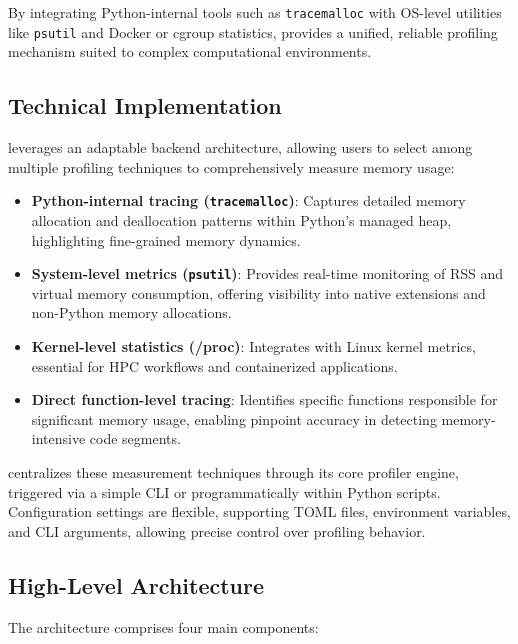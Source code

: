 By integrating Python-internal tools such as \texttt{tracemalloc} with \ac{OS}-level utilities like \texttt{psutil} and Docker or \ac{cgroup} statistics, \traceq provides a unified, reliable profiling mechanism suited to complex computational environments.

\subsection{Technical Implementation}
\label{sec:mmc-traceq-implementation}

\traceq leverages an adaptable backend architecture, allowing users to select among multiple profiling techniques to comprehensively measure memory usage:

\begin{itemize}
    \item \textbf{Python-internal tracing (\texttt{tracemalloc})}: Captures detailed memory allocation and deallocation patterns within Python’s managed heap, highlighting fine-grained memory dynamics.
    \item \textbf{System-level metrics (\texttt{psutil})}: Provides real-time monitoring of \ac{RSS} and virtual memory consumption, offering visibility into native extensions and non-Python memory allocations.
    \item \textbf{Kernel-level statistics (/proc)}: Integrates with Linux kernel metrics, essential for \ac{HPC} workflows and containerized applications.
    \item \textbf{Direct function-level tracing}: Identifies specific functions responsible for significant memory usage, enabling pinpoint accuracy in detecting memory-intensive code segments.
\end{itemize}

\traceq centralizes these measurement techniques through its core profiler engine, triggered via a simple \ac{CLI} or programmatically within Python scripts.
Configuration settings are flexible, supporting \ac{TOML} files, environment variables, and \ac{CLI} arguments, allowing precise control over profiling behavior.

\subsection{High-Level Architecture}
\label{sec:mmc-traceq-architecture}

The \traceq architecture comprises four main components:

